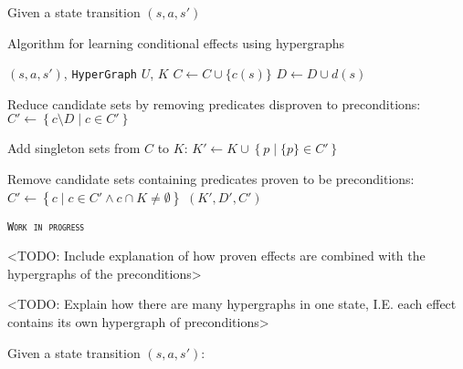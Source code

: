 \documentclass[../Master.tex]{subfiles}
\begin{document}
Given a state transition $\left( s, a ,s' \right)$


\begin{algorithm}
    \caption{Algorithm for learning conditional effects using hypergraphs}\label{algo:CondEffLearn}
    \begin{algorithmic}
         {$\left( s, a, s'\right)$, \texttt{HyperGraph} $U$, $K$}
                \State $C \gets C \cup \{ c(s) \}$
                \State $D \gets D \cup d(s)$
            \EndIf

            \State Reduce candidate sets by removing predicates disproven to preconditions:
            \State $C' \gets \left\{ c \setminus D \; | \; c \in C' \right\}$

            \State Add singleton sets from $C$ to $K$:
            \State $K' \gets K \cup \left\{ p \; | \; \{ p \} \in C' \right\}$

            \State Remove candidate sets containing predicates proven to be preconditions:
            \State $C' \gets \left\{ c \; | \; c \in C' \land c \cap K \neq \emptyset \right\}$
            \State \Return $(K', D', C')$
        \EndFunction%
    \end{algorithmic}
\end{algorithm}

\textsc{\texttt{Work in progress}}

<TODO: Include explanation of how proven effects are combined with the hypergraphs of the preconditions>

<TODO: Explain how there are many hypergraphs in one state, I.E. each effect contains its own hypergraph of preconditions>

Given a state transition $(s,a,s')$:
\end{document}
